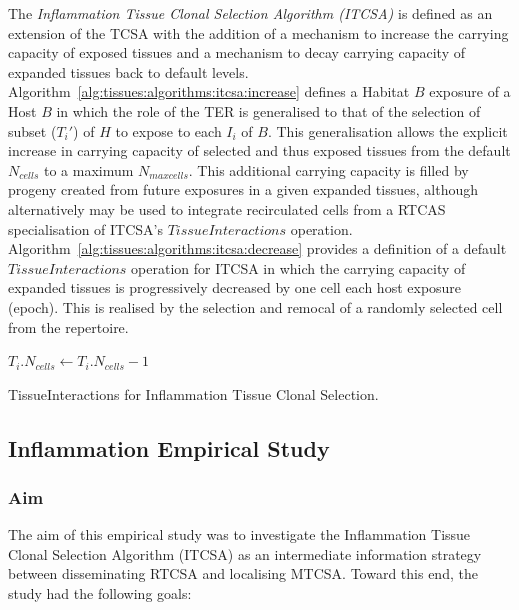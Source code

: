 The \emph{Inflammation Tissue Clonal Selection Algorithm (ITCSA)} is defined as an extension of the TCSA with the addition of a mechanism to increase the carrying capacity of exposed tissues and a mechanism to decay carrying capacity of expanded tissues back to default levels. Algorithm~\ref{alg:tissues:algorithms:itcsa:increase} defines a Habitat $B$ exposure of a Host $B$ in which the role of the TER is generalised to that of the selection of subset ($T_{i}\prime$) of $H$ to expose to each $I_i$ of $B$. This generalisation allows the explicit increase in carrying capacity of selected and thus exposed tissues from the default $N_{cells}$ to a maximum $N_{maxcells}$. This additional carrying capacity is filled by progeny created from future exposures in a given expanded tissues, although alternatively may be used to integrate recirculated cells from a RTCAS specialisation of ITCSA's $TissueInteractions$ operation. Algorithm~\ref{alg:tissues:algorithms:itcsa:decrease} provides a definition of a default $TissueInteractions$ operation for ITCSA in which the carrying capacity of expanded tissues is progressively decreased by one cell each host exposure (epoch). This is realised by the selection and remocal of a randomly selected cell from the repertoire.

\begin{algorithm}[htp]
  \SetLine
  
  
	{
		{
			$T_i$.$N_{cells} \leftarrow T_i$.$N_{cells} - 1$\;
		}
	}	
	\caption{TissueInteractions for Inflammation Tissue Clonal Selection.}
	\label{alg:tissues:algorithms:itcsa:decrease}
\end{algorithm}


%
%
\subsection{Inflammation Empirical Study}
\label{sec:tissues:recruitment:study}
%
%
\subsubsection{Aim}
The aim of this empirical study was to investigate the Inflammation Tissue Clonal Selection Algorithm (ITCSA) as an intermediate information strategy between disseminating RTCSA and localising MTCSA. Toward this end, the study had the following goals:

